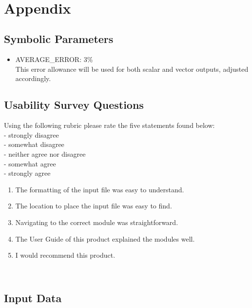 \documentclass[12pt, titlepage]{article}
\begin{document}
~\newpage


\section{Appendix}


\subsection{Symbolic Parameters}
\label{symbolpara}
\begin{itemize}

\item[\label{Cons_AVERAGE_ERROR}]AVERAGE\_ERROR: 3\%\\This error allowance will be used for both scalar and vector outputs, adjusted accordingly.

\end{itemize}

\subsection{Usability Survey Questions}
\label{usabilitysurevyquestions}
Using the following rubric please rate the five statements found below:\\
\linebreak
{} - strongly disagree\\
 - somewhat disagree\\
 - neither agree nor disagree\\
 - somewhat agree\\
 - strongly agree\\

\begin{enumerate}
\item The formatting of the input file was easy to understand.
\item The location to place the input file was easy to find.
\item Navigating to the correct module was straightforward.
\item The User Guide of this product explained the modules well.
\item I would recommend this product.
\end{enumerate}

~\newpage
\subsection{Input Data}
\label{inputdata}
\end{document}
